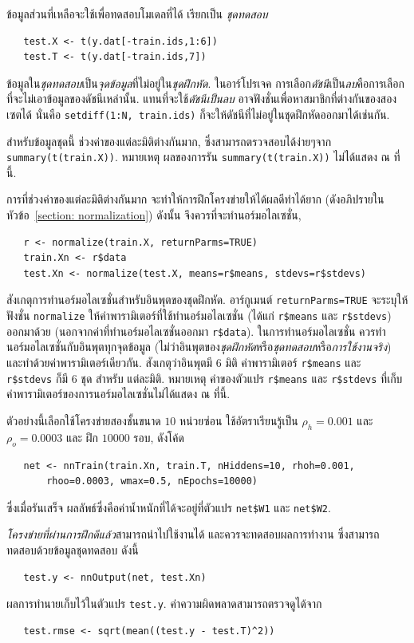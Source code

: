 ข้อมูลส่วนที่เหลือจะใช้เพื่อทดสอบโมเดลที่ได้ เรียกเป็น \textit{ชุดทดสอบ}
\begin{verbatim}
   test.X <- t(y.dat[-train.ids,1:6])
   test.T <- t(y.dat[-train.ids,7])
\end{verbatim}
ข้อมูลใน\textit{ชุดทดสอบ}เป็น\textit{จุดข้อมูล}ที่ไม่อยู่ใน\textit{ชุดฝึกหัด}.
ในอาร์โปรเจค การเลือก\textit{ดัชนี}เป็น\textit{ลบ}คือการเลือกที่จะไม่เอาข้อมูลของดัชนีเหล่านั้น.
แทนที่จะใช้\textit{ดัชนีเป็นลบ} อาจฟังชั่นเพื่อหาสมาชิกที่ต่างกันของสองเซตได้ นั่นคือ \texttt{setdiff(1:N, train.ids)} ก็จะให้ดัชนีที่ไม่อยู่ในชุดฝึกหัดออกมาได้เช่นกัน.

สำหรับข้อมูลชุดนี้ ช่วงค่าของแต่ละมิติต่างกันมาก, 
ซึ่งสามารถตรวจสอบได้ง่ายๆจาก\\ 
\texttt{summary(t(train.X))}.
หมายเหตุ ผลของการรัน \texttt{summary(t(train.X))} ไม่ได้แสดง ณ ที่นี้.

การที่ช่วงค่าของแต่ละมิติต่างกันมาก จะทำให้การฝึกโครงข่ายให้ได้ผลดีทำได้ยาก (ดังอภิปรายในหัวข้อ~\ref{section: normalization}) ดังนั้น จึงควรที่จะทำนอร์มอไลเซชั่น,
\begin{verbatim}
   r <- normalize(train.X, returnParms=TRUE)
   train.Xn <- r$data
   test.Xn <- normalize(test.X, means=r$means, stdevs=r$stdevs)
\end{verbatim}
สังเกตุการทำนอร์มอไลเซชั่นสำหรับอินพุตของชุดฝึกหัด.
อาร์กูเมนต์ \texttt{returnParms=TRUE} จะระบุให้ฟังชั่น \texttt{normalize} ให้ค่าพารามิเตอร์ที่ใช้ทำนอร์มอไลเซชั่น (ได้แก่ \texttt{r\$means} และ \texttt{r\$stdevs}) ออกมาด้วย (นอกจากค่าที่ทำนอร์มอไลเซชั่นออกมา \texttt{r\$data}).
%
ในการทำนอร์มอไลเซชั่น ควรทำนอร์มอไลเซชั่นกับอินพุตทุกจุดข้อมูล (ไม่ว่าอินพุตของ\textit{ชุดฝึกหัด}หรือ\textit{ชุดทดสอบ}หรือ\textit{การใช้งานจริง}) และทำด้วยค่าพารามิเตอร์เดียวกัน.
สังเกตุว่าอินพุตมี $6$ มิติ ค่าพารามิเตอร์ \texttt{r\$means} และ \texttt{r\$stdevs} ก็มี $6$ ชุด สำหรับ แต่ละมิติ.
หมายเหตุ ค่าของตัวแปร \texttt{r\$means} และ \texttt{r\$stdevs} ที่เก็บค่าพารามิเตอร์ของการนอร์มอไลเซชั่นไม่ได้แสดง ณ ที่นี้.

ตัวอย่างนี้เลือกใช้โครงข่ายสองชั้นขนาด $10$ หน่วยซ่อน
ใช้อัตราเรียนรู้เป็น $\rho_h = 0.001$ และ $\rho_o = 0.0003$ และ ฝึก $10000$ รอบ, ดังโค้ด
\begin{verbatim}
   net <- nnTrain(train.Xn, train.T, nHiddens=10, rhoh=0.001,      
       rhoo=0.0003, wmax=0.5, nEpochs=10000)
\end{verbatim}
ซึ่งเมื่อรันเสร็จ ผลลัพธ์ซึ่งคือค่าน้ำหนักที่ได้จะอยู่ที่ตัวแปร \texttt{net\$W1} และ \texttt{net\$W2}.

\textit{โครงข่ายที่ผ่านการฝึกดีแล้ว}สามารถนำไปใช้งานได้ 
และควรจะทดสอบผลการทำงาน ซึ่งสามารถทดสอบด้วยข้อมูลชุดทดสอบ ดังนี้
\begin{verbatim}
   test.y <- nnOutput(net, test.Xn)
\end{verbatim}
ผลการทำนายเก็บไว้ในตัวแปร \texttt{test.y}.
ค่าความผิดพลาดสามารถตรวจดูได้จาก
\begin{verbatim}
   test.rmse <- sqrt(mean((test.y - test.T)^2))
\end{verbatim}

